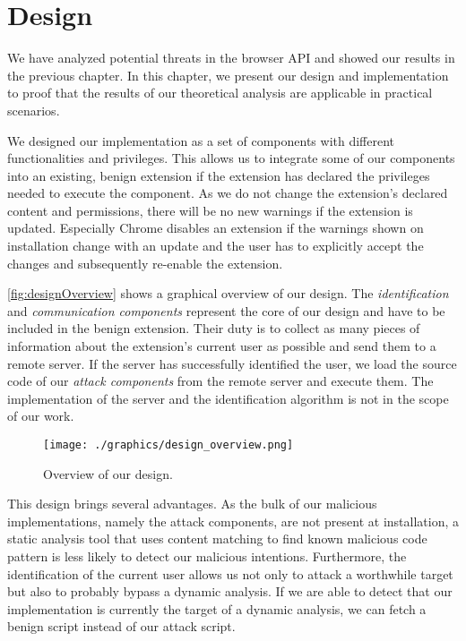
\chapter{Design}
\label{chp:design}

	We have analyzed potential threats in the browser API and showed our results in the previous chapter. In this chapter, we present our design and implementation to proof that the results of our theoretical analysis are applicable in practical scenarios. 
	
	We designed our implementation as a set of components with different functionalities and privileges. This allows us to integrate some of our components into an existing, benign extension if the extension has declared the privileges needed to execute the component. As we do not change the extension's declared content and permissions, there will be no new warnings if the extension is updated. Especially Chrome disables an extension if the warnings shown on installation change with an update and the user has to explicitly accept the changes and subsequently re-enable the extension. 
	
	\autoref{fig:designOverview} shows a graphical overview of our design. The \textit{identification} and \textit{communication components} represent the core of our design and have to be included in the benign extension. Their duty is to collect as many pieces of information about the extension's current user as possible and send them to a remote server. If the server has successfully identified the user, we load the source code of our \textit{attack components} from the remote server and execute them. The implementation of the server and the identification algorithm is not in the scope of our work. 
	
	\begin{figure}[h]
		\centering
		\texttt{[image: ./graphics/design\_overview.png]}
		\caption{Overview of our design.}
		\label{fig:designOverview}
	\end{figure}
	
	This design brings several advantages. As the bulk of our malicious implementations, namely the attack components, are not present at installation, a static analysis tool that uses content matching to find known malicious code pattern is less likely to detect our malicious intentions. Furthermore, the identification of the current user allows us not only to attack a worthwhile target but also to probably bypass a dynamic analysis. If we are able to detect that our implementation is currently the target of a dynamic analysis, we can fetch a benign script instead of our attack script. 

